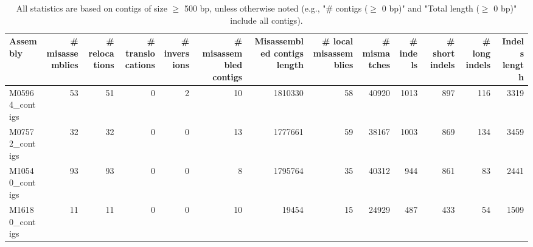 \documentclass[12pt,a4paper]{article}
\begin{document}
\begin{table}[ht]
\begin{center}
\caption{All statistics are based on contigs of size $\geq$ 500 bp, unless otherwise noted (e.g., "\# contigs ($\geq$ 0 bp)" and "Total length ($\geq$ 0 bp)" include all contigs).}
\begin{tabular}{|l*{12}{|r}|}
\hline
Assembly & \# misassemblies &     \# relocations &     \# translocations &     \# inversions & \# misassembled contigs & Misassembled contigs length & \# local misassemblies & \# mismatches & \# indels &     \# short indels &     \# long indels & Indels length \\ \hline
M05964\_contigs & 53 & 51 & 0 & 2 & 10 & 1810330 & 58 & 40920 & 1013 & 897 & 116 & 3319 \\ \hline
M07572\_contigs & 32 & 32 & 0 & 0 & 13 & 1777661 & 59 & 38167 & 1003 & 869 & 134 & 3459 \\ \hline
M10540\_contigs & 93 & 93 & 0 & 0 & 8 & 1795764 & 35 & 40312 & 944 & 861 & 83 & 2441 \\ \hline
M16180\_contigs & 11 & 11 & 0 & 0 & 10 & 19454 & 15 & 24929 & 487 & 433 & 54 & 1509 \\ \hline
\end{tabular}
\end{center}
\end{table}
\end{document}

